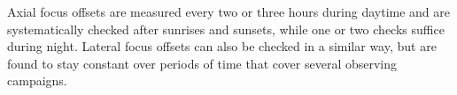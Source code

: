 {\lp Axial focus offsets are measured every two or three hours during daytime and
are systematically checked after sunrises and sunsets, while one or
two checks suffice during night. 
Lateral focus offsets can also be checked in a similar way, but are
found to stay constant over periods of time that cover several
observing campaigns.}






